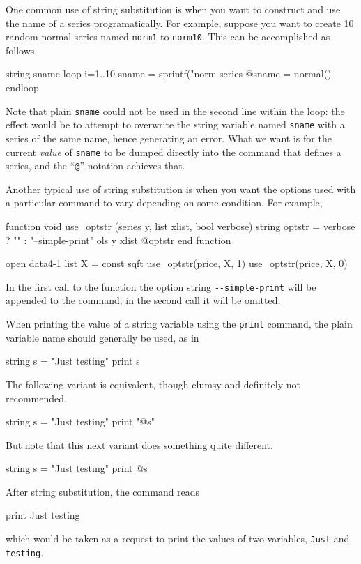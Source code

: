 One common use of string substitution is when you want to construct
and use the name of a series programatically. For example, suppose you
want to create 10 random normal series named \texttt{norm1} to
\texttt{norm10}. This can be accomplished as follows.
%
\begin{code}
string sname
loop i=1..10
  sname = sprintf("norm%
  series @sname = normal()
endloop
\end{code}
%
Note that plain \texttt{sname} could not be used in the second line
within the loop: the effect would be to attempt to overwrite the
string variable named \texttt{sname} with a series of the same name,
hence generating an error. What we want is for the current
\textit{value} of \texttt{sname} to be dumped directly into the
command that defines a series, and the ``\verb|@|'' notation achieves
that.

Another typical use of string substitution is when you want the
options used with a particular command to vary depending on
some condition. For example,
%
\begin{code}
function void use_optstr (series y, list xlist, bool verbose)
   string optstr = verbose ? "" : "--simple-print"
   ols y xlist @optstr 
end function

open data4-1
list X = const sqft
use_optstr(price, X, 1)
use_optstr(price, X, 0)
\end{code}

In the first call to the function  the option
string \verb|--simple-print| will be appended to the 
command; in the second call it will be omitted.

When printing the value of a string variable using the \texttt{print}
command, the plain variable name should generally be used, as in
%
\begin{code}
string s = "Just testing"
print s
\end{code}
%
The following variant is equivalent, though clumsy and definitely not
recommended.
%
\begin{code}
string s = "Just testing"
print "@s"
\end{code}
%
But note that this next variant does something quite different.
%
\begin{code}
string s = "Just testing"
print @s
\end{code}
%
After string substitution, the command reads
%
\begin{code}
print Just testing
\end{code}
%
which would be taken as a request to print the values of two
variables, \texttt{Just} and \texttt{testing}.

